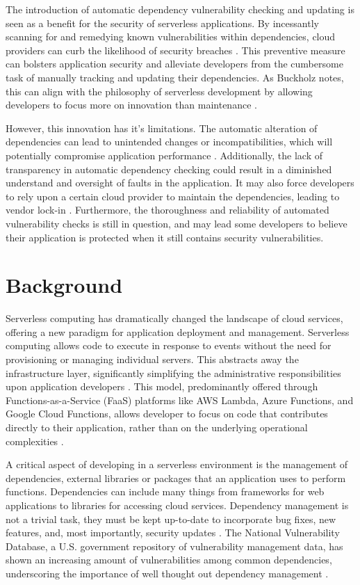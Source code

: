 \documentclass[sigconf]{acmart}
\begin{document}
The introduction of automatic dependency vulnerability checking and updating is seen as a benefit for the security of serverless applications. By incessantly scanning for and remedying known vulnerabilities within dependencies, cloud providers can curb the likelihood of security breaches \cite{snyk2023security}. This preventive measure can bolsters application security and alleviate developers from the cumbersome task of manually tracking and updating their dependencies. As Buckholz notes, this can align with the philosophy of serverless development by allowing developers to focus more on innovation than maintenance \cite{buckholz2018serverless}. 

However, this innovation has it's limitations. The automatic alteration of dependencies can lead to unintended changes or incompatibilities, which will potentially compromise application performance \cite{benischke2023updates}. Additionally, the lack of transparency in automatic dependency checking could result in a diminished understand and oversight of faults in the application. It may also force developers to rely upon a certain cloud provider to maintain the dependencies, leading to vendor lock-in \cite{kavis2014cloud}.
Furthermore, the thoroughness and reliability of automated vulnerability checks is still in question, and may lead some developers to believe their application is protected when it still contains security vulnerabilities.

\section{Background}
Serverless computing has dramatically changed the landscape of cloud services, offering a new paradigm for application deployment and management. Serverless computing allows code to execute in response to events without the need for provisioning or managing individual servers. This abstracts away the infrastructure layer, significantly simplifying the administrative responsibilities upon application developers \cite{roberts2020lambda}. This model, predominantly offered through Functions-as-a-Service (FaaS) platforms like AWS Lambda, Azure Functions, and Google Cloud Functions, allows developer to focus on code that contributes directly to their application, rather than on the underlying operational complexities \cite{villamizar2015evaluating}.

A critical aspect of developing in a serverless environment is the management of dependencies, external libraries or packages that an application uses to perform functions. Dependencies can include many things from frameworks for web applications to libraries for accessing cloud services. Dependency management is not a trivial task, they must be kept up-to-date to incorporate bug fixes, new features, and, most importantly, security updates \cite{benischke2023updates}. The National Vulnerability Database, a U.S. government repository of vulnerability management data, has shown an increasing amount of vulnerabilities among common dependencies, underscoring the importance of well thought out dependency management \cite{NVDdatabase}.
\end{document}
